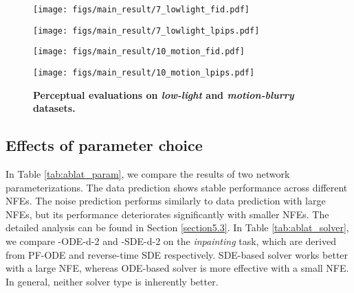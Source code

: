 \begin{figure}[!ht]
    \centering
    \begin{minipage}[b]{0.45\textwidth}
        \centering
        \texttt{[image: figs/main\_result/7\_lowlight\_fid.pdf]}
        \label{fig:main(a)}
    \end{minipage}
    \begin{minipage}[b]{0.45\textwidth}
        \centering
        \texttt{[image: figs/main\_result/7\_lowlight\_lpips.pdf]}
        \label{fig:main(b)}
    \end{minipage}
    \begin{minipage}[b]{0.45\textwidth}
        \centering
        \texttt{[image: figs/main\_result/10\_motion\_fid.pdf]}
        \label{fig:main(c)}
    \end{minipage}
    \begin{minipage}[b]{0.45\textwidth}
        \centering
        \texttt{[image: figs/main\_result/10\_motion\_lpips.pdf]}
        \label{fig:main(d)}
    \end{minipage}
    \caption{\textbf{Perceptual evaluations on \textit{low-light} and \textit{motion-blurry} datasets.}}
    \label{fig:main}
\end{figure}

\subsection{Effects of parameter choice}\label{effects}

In Table \ref{tab:ablat_param}, we compare the results of two network parameterizations. The data prediction shows stable performance across different NFEs. The noise prediction performs similarly to data prediction with large NFEs, but its performance deteriorates significantly with smaller NFEs. The detailed analysis can be found in Section \ref{section5.3}. In Table \ref{tab:ablat_solver}, we compare \ourmethod-ODE-d-2 and \ourmethod-SDE-d-2 on the \textit{inpainting} task, which are derived from PF-ODE and reverse-time SDE respectively. SDE-based solver works better with a large NFE, whereas ODE-based solver is more effective with a small NFE. In general, neither solver type is inherently better.


